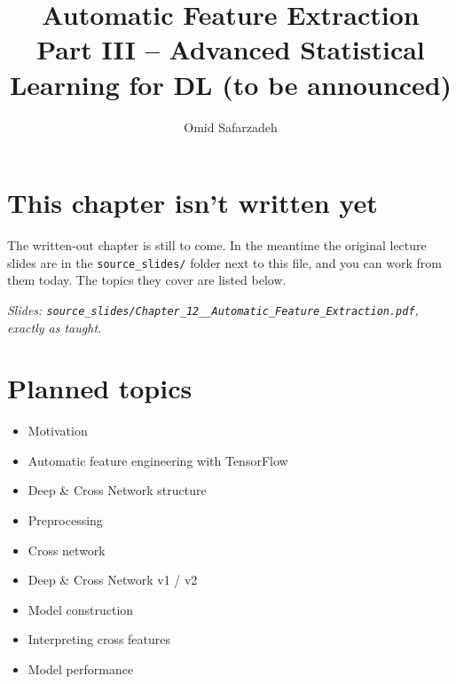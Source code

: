 \documentclass[11pt]{article}
\title{Automatic Feature Extraction \\ \large Part III -- Advanced Statistical Learning for DL (to be announced)}
\author{Omid Safarzadeh}
\date{}
\begin{document}
\maketitle

\section*{This chapter isn't written yet}
The written-out chapter is still to come. In the meantime the original
lecture slides are in the \texttt{source\_slides/} folder next to this
file, and you can work from them today. The topics they cover are listed
below.

\textit{Slides: \texttt{source\_slides/Chapter\_12\_\_Automatic\_Feature\_Extraction.pdf}, exactly as taught.}



\section*{Planned topics}
\begin{itemize}
  \item Motivation
  \item Automatic feature engineering with TensorFlow
  \item Deep \& Cross Network structure
  \item Preprocessing
  \item Cross network
  \item Deep \& Cross Network v1 / v2
  \item Model construction
  \item Interpreting cross features
  \item Model performance
\end{itemize}
\end{document}
